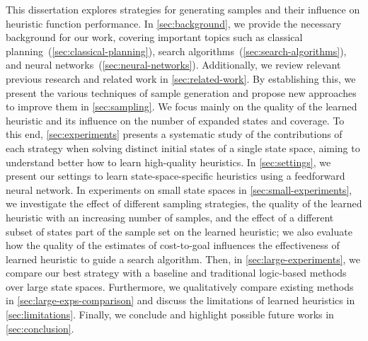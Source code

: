 This dissertation explores strategies for generating samples and their influence on heuristic function performance. In \cref{sec:background}, we provide the necessary background for our work, covering important topics such as classical planning~(\cref{sec:classical-planning}), search algorithms~(\cref{sec:search-algorithms}), and neural networks~(\cref{sec:neural-networks}). Additionally, we review relevant previous research and related work in \cref{sec:related-work}. By establishing this, we present the various techniques of sample generation and propose new approaches to improve them in \cref{sec:sampling}. We focus mainly on the quality of the learned heuristic and its influence on the number of expanded states and coverage. To this end, \cref{sec:experiments} presents a systematic study of the contributions of each strategy when solving distinct initial states of a single state space, aiming to understand better how to learn high-quality heuristics. In \cref{sec:settings}, we present our settings to learn state-space-specific heuristics using a feedforward neural network. In experiments on small state spaces in \cref{sec:small-experiments}, we investigate the effect of different sampling strategies, the quality of the learned heuristic with an increasing number of samples, and the effect of a different subset of states part of the sample set on the learned heuristic; we also evaluate how the quality of the estimates of cost-to-goal influences the effectiveness of learned heuristic to guide a search algorithm. Then, in \cref{sec:large-experiments}, we compare our best strategy with a baseline and traditional logic-based methods over large state spaces. Furthermore, we qualitatively compare existing methods in \cref{sec:large-exps-comparison} and discuss the limitations of learned heuristics in \cref{sec:limitations}. Finally, we conclude and highlight possible future works in \cref{sec:conclusion}.
